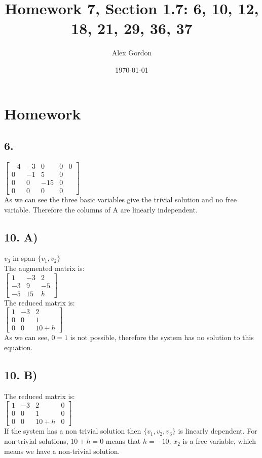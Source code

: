 \documentclass[12]{scrartcl}
\begin{document}
\title{Homework 7, Section 1.7: 6, 10, 12, 18, 21, 29, 36, 37}
\author{Alex Gordon}
\date{\today}
\maketitle
\section*{Homework}
\subsection*{6.}
$\begin{bmatrix} -4&-3&0&0&0 \\ 0&-1&5&0 \\ 0&0&-15&0 \\ 0&0&0&0  \end{bmatrix}$\\

As we can see the three basic variables give the trivial solution and no free variable. Therefore the columns of A are linearly independent. 
\subsection*{10. A)}
$v_3$ in span $\{v_1, v_2\}$\\
The augmented matrix is:\\
$\begin{bmatrix} 1&-3&2 \\ -3&9&-5 \\ -5&15&h  \end{bmatrix}$\\
The reduced matrix is:\\
$\begin{bmatrix} 1&-3&2 \\ 0&0&1 \\ 0&0&10+h  \end{bmatrix}$\\
As we can see, $0 = 1$ is not possible, therefore the system has no solution to this equation. 
\subsection*{10. B)}
The reduced matrix is:\\
$\begin{bmatrix} 1&-3&2&0 \\0&0&1&0 \\ 0&0&10+h&0  \end{bmatrix}$\\
If the system has a non trivial solution then $\{v_1, v_2, v_3\}$ is linearly dependent. For non-trivial solutions, $10+h = 0$ means that $h = -10$. $x_2$ is a free variable, which means we have a non-trivial solution. 
\end{document}
